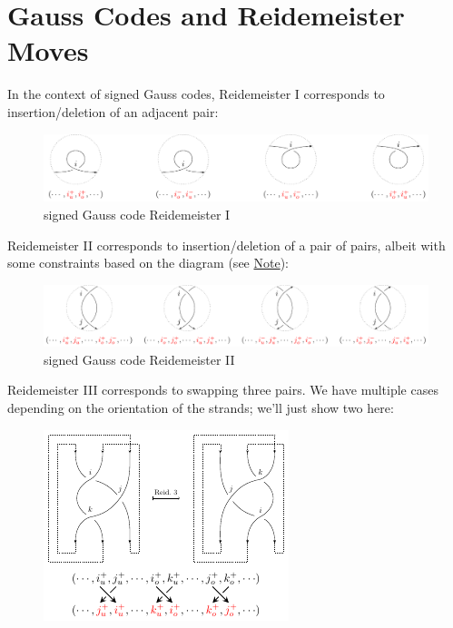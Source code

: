 \section{Gauss Codes and Reidemeister
  Moves}\label{sec:gauss-codes-and-reidemeister-moves}
In the context of signed Gauss codes, Reidemeister I corresponds to
insertion/deletion of an adjacent pair:
\begin{figure}[H]
  \centering
  \includegraphics[scale=.5]{figures/background/gauss-moves/gauss-r1.pdf}
  \caption{signed Gauss code Reidemeister I}
\end{figure}
Reidemeister II corresponds to insertion/deletion of a pair of pairs,
albeit with some constraints based on the diagram (see
\hyperlink{note:gauss-code-reidemeister-2}{Note}):
\begin{figure}[H]
  \centering
  \includegraphics[scale=.5]{figures/background/gauss-moves/gauss-r2.pdf}
  \caption{signed Gauss code Reidemeister II}
\end{figure}
Reidemeister III corresponds to swapping three pairs. We have multiple
cases depending on the orientation of the strands; we'll just show two
here:%
\begin{figure}[H]
  \centering
  \includegraphics[scale=1.5]{figures/background/gauss-moves/gauss-r3-pair-a.pdf}
\end{figure}
